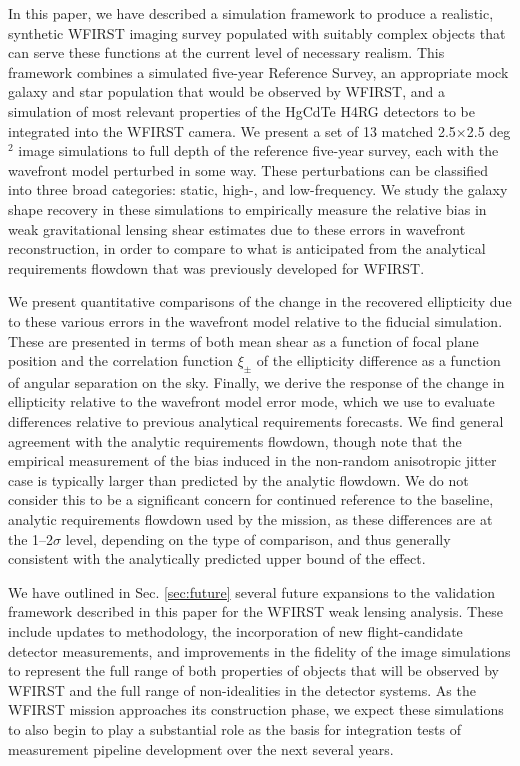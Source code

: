\documentclass[usenatbib]{mnras}
\begin{document}
In this paper, we have described a simulation framework to produce a realistic, synthetic WFIRST imaging survey populated with suitably complex objects that can serve these functions at the current level of necessary realism. 
This framework combines a simulated five-year Reference Survey, an appropriate mock galaxy and star population that would be observed by WFIRST, and a simulation of most relevant properties of the HgCdTe H4RG detectors to be integrated into the WFIRST camera. 
We present a set of 13 matched 2.5$\times$2.5 deg$^2$ image simulations to full depth of the reference five-year survey, each with the wavefront model perturbed in some way. These perturbations can be classified into three broad categories: static, high-, and low-frequency.
We study the galaxy shape recovery in these simulations to empirically measure the relative bias in weak gravitational lensing shear estimates due to these errors in wavefront reconstruction, in order to compare to what is anticipated from the analytical requirements flowdown that was previously developed for WFIRST.  

We present quantitative comparisons of the change in the recovered ellipticity due to these various errors in the wavefront model relative to the fiducial simulation. 
These are presented in terms of both mean shear as a function of focal plane position and the correlation function $\xi_{\pm}$ of the ellipticity difference as a function of angular separation on the sky. 
Finally, we derive the response of the change in ellipticity relative to the wavefront model error mode, which we use to evaluate differences relative to previous analytical requirements forecasts.
We find general agreement with the analytic requirements flowdown, though note that the empirical measurement of the bias induced in the non-random anisotropic jitter case is typically larger than predicted by the analytic flowdown. 
We do not consider this to be a significant concern for continued reference to the baseline, analytic requirements flowdown used by the mission, as these differences are at the 1--2$\sigma$ level, depending on the type of comparison, and thus generally consistent with the analytically predicted upper bound of the effect. 

We have outlined in Sec. \ref{sec:future} several future expansions to the validation framework described in this paper for the WFIRST weak lensing analysis. 
These include updates to methodology, the incorporation of new flight-candidate detector measurements, and improvements in the fidelity of the image simulations to represent the full range of both properties of objects that will be observed by WFIRST and the full range of non-idealities in the detector systems. 
As the WFIRST mission approaches its construction phase, we expect these simulations to also begin to play a substantial role as the basis for integration tests of measurement pipeline development over the next several years. 
\end{document}
